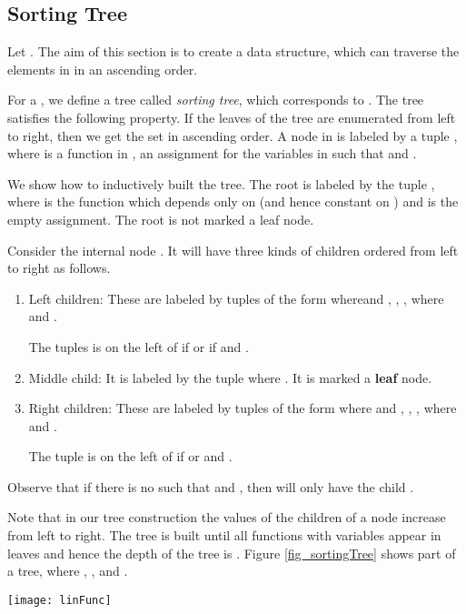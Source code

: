 \documentclass[envcountsame]{llncs}
\begin{document}
 
\subsection{Sorting Tree} \label{subsec_sortingtree}
Let . The aim of this section is to create a data structure, which can traverse the elements in  in an ascending order. 



For a , we define a tree called \emph{sorting tree},  which corresponds to . The tree satisfies the
following property.
If the leaves of the tree are enumerated from left to right, then we get the set  in ascending order.
A node in  is labeled by a tuple , where  is a function in ,  an assignment for the variables in  
such that  and . 

We show how to inductively built the tree. The root is labeled by the tuple , where  is the function which depends only on  (and hence constant on )
 and  is the empty assignment. The root is not marked a leaf node.


Consider the internal node . It will have three kinds of children ordered from left to right as follows.
\begin{enumerate}
 \item Left children: These are labeled by tuples of the form  
where\linebreak  and , , , where  and .

 The tuples  is on the left of  if  or if  and . 
 \item Middle child: It is labeled by the tuple  where . It is marked a {\bf leaf} node.
  \item Right children: These are labeled by tuples of the form  
where  and , , , where  and .

The tuple  is on the left of  if  or  and . 
\end{enumerate}

Observe that if there is no  such that  and , then  will only have the child .


Note that in our tree construction the values of the children of a node increase from left to right. The tree is built until
all functions with  variables appear in leaves and hence the depth of the tree is .
Figure \ref{fig_sortingTree} shows part of a tree, where , ,  and .

\begin{figure*}
\centering
\vspace*{-4mm}
\texttt{[image: linFunc]} 
\vspace*{-4mm}
\caption{Sorting Tree: The double circles represent leaves of the tree. The nodes of the tree are labelled , 
where  is an assignment for the function  and . For better presentation we only show the assignment to the newly introduced variable in a node. 
For example, the tuple  assigns  and . The assignment to  is given in the node's parent.}
\label{fig_sortingTree}
\vspace*{-5mm}
\end{figure*} 
\end{document}
